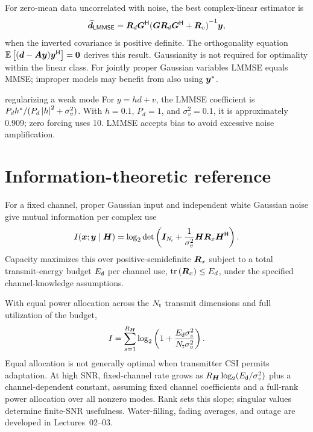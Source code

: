 For zero-mean data  uncorrelated with noise, the best complex-linear estimator is
\begin{equation}
\widehat{\bm{d}}_{\mathsf{LMMSE}}=\bm{R}_d{\bm{G}}^{\mathsf{H}}
{(\bm{G}\bm{R}_d{\bm{G}}^{\mathsf{H}}+\bm{R}_v)}^{-1}\bm{y},
\end{equation}
when the inverted covariance is positive definite. The orthogonality equation $\mathbb{E}\left[(\bm{d}-\bm{A}\bm{y}){\bm{y}}^{\mathsf{H}}\right]=\bm{0}$ derives this result. Gaussianity is not required for optimality within the linear class. For jointly proper Gaussian variables LMMSE equals MMSE; improper models may benefit from also using ${\bm{y}}^{*}$.

\begin{example}{regularizing a weak mode}
For $y=hd+v$, the LMMSE coefficient is $P_d{h}^{*}/(P_d\left|h\right|^2+\sigma_v^2)$. With $h=0.1$, $P_d=1$, and $\sigma_v^2=0.1$, it is approximately 0.909; zero forcing uses 10. LMMSE accepts bias to avoid excessive noise amplification.
\end{example}

\section{Information-theoretic reference}
For a fixed channel, proper Gaussian input and independent white Gaussian noise give mutual information per complex use
\begin{equation}
I(\bm{x};\bm{y}\mid\bm{H})=\log_2\operatorname{det}\left(\bm{I}_{N_{\mathsf{r}}}+\frac{1}{\sigma_v^2}\bm{H}\bm{R}_x{\bm{H}}^{\mathsf{H}}\right).
\end{equation}
Capacity maximizes this over positive-semidefinite $\bm{R}_x$
subject to a total transmit-energy budget $E_{\mathsf{d}}$ per channel use,
$\operatorname{tr}\left(\bm{R}_x\right)\leq E_d$, under the specified
channel-knowledge assumptions.

With equal power allocation across the $N_{\mathsf{t}}$ transmit
dimensions and full utilization of the budget,
\begin{equation}
	I=\sum_{s=1}^{R_{\bm{H}}}
	\log_2\left(
	1+\frac{E_{\mathsf{d}}\sigma_s^2}{N_{\mathsf{t}}\sigma_v^2}
	\right).
\end{equation}
Equal allocation is not generally optimal when transmitter CSI permits adaptation. At high SNR, fixed-channel rate grows as $R_{\bm{H}}\log_2(E_{\mathsf{d}}/\sigma_v^2)$ plus a channel-dependent constant, assuming fixed channel coefficients and a full-rank power allocation over all nonzero modes. Rank sets this slope; singular values determine finite-SNR usefulness. Water-filling, fading averages, and outage are developed in Lectures~02--03.

